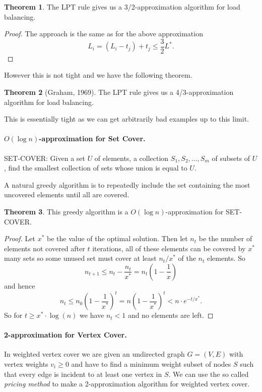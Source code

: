 \documentclass[11pt,a4paper]{article}
\theoremstyle{definition}
\newtheorem{thm}{Theorem}
\begin{document}
\begin{thm}
The LPT rule gives us a 3/2-approximation algorithm for load balancing.
\end{thm}
\begin{proof}
The approach is the same as for the above approximation
\[
L_i = (L_i - t_j) + t_j \le \frac{3}{2} L^*.
\]
\end{proof}
However this is not tight and we have the following theorem.
\begin{thm}[Graham, 1969]
The LPT rule gives us a 4/3-approximation algorithm for load balancing.
\end{thm}
This is essentially tight as we can get arbitrarily bad examples up to this limit.

\paragraph{$O(\log n)$-approximation for Set Cover.}
SET-COVER: Given a set $U$ of elements, a collection $S_1,S_2,\ldots,S_m$ of subsets of $U$, find the smallest collection of sets whose union is equal to $U$.

A natural greedy algorithm is to repeatedly include the set containing the most uncovered elements until all are covered.

\begin{thm}
This greedy algorithm is a $O(\log n)$-approximation for SET-COVER.
\end{thm}
\begin{proof}
Let $x^*$ be the value of the optimal solution.
Then let $n_t$ be the number of elements not covered after $t$ iterations, all of these elements can be covered by $x^*$ many sets so some unused set must cover at least $n_t/x^*$ of the $n_t$ elements.
So
\[
n_{t+1} \le n_t - \frac{n_t}{x^*} = n_t \left(1- \frac{1}{x}\right)
\]
and hence
\[
n_t \le n_0 \left(1-\frac{1}{x^*}\right)^t = n\left(1-\frac{1}{x^*}\right)^t < n\cdot e^{-t/x^*}.
\]
So for $t \ge x^* \cdot \log(n)$ we have $n_t < 1$ and no elements are left.
\end{proof}

\paragraph{2-approximation for Vertex Cover.}
In weighted vertex cover we are given an undirected graph $G = (V,E)$ with vertex weights $v_i \ge 0$ and have to find a minimum weight subset of nodes $S$ such that every edge is incident to at least one vertex in $S$.
We can use the so called \emph{pricing method} to make a 2-approximation algorithm for weighted vertex cover.
\end{document}

